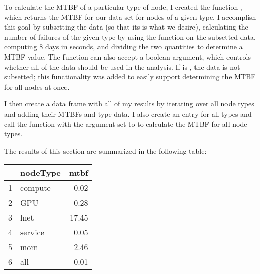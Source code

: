 To calculate the MTBF of a particular type of node, I created the function , which returns the MTBF for our data set for nodes of a given type.  I accomplish this goal by subsetting the data (so that its  is what we desire), calculating the number of failures of the given type by using the  function on the subsetted data, computing 8 days in seconds, and dividing the two quantities to determine a MTBF value.  The function can also accept a boolean  argument, which controls whether all of the data should be used in the analysis.  If  is , the data is not subsetted; this functionality was added to easily support determining the MTBF for all nodes at once.

I then create a data frame with all of my results by iterating over all node types and adding their MTBFs and type data.  I also create an entry for all types and call the  function with the  argument set to  to calculate the MTBF for all node types.

The results of this section are summarized in the following table:

\begin{table}[ht]
\centering
\begin{tabular}{rlr}
  \hline
 & nodeType & mtbf \\ 
  \hline
1 & compute & 0.02 \\ 
  2 & GPU & 0.28 \\ 
  3 & lnet & 17.45 \\ 
  4 & service & 0.05 \\ 
  5 & mom & 2.46 \\ 
  6 & all & 0.01 \\ 
   \hline
\end{tabular}
\end{table}
